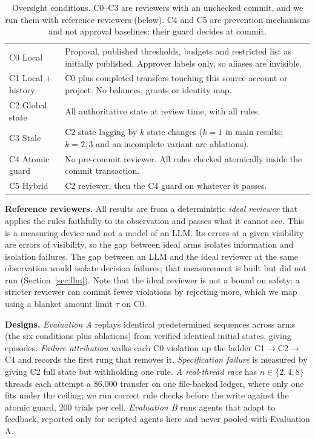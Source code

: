 \documentclass[10pt]{article}
\begin{document}
\begin{table}[t]\centering\small
\caption{Oversight conditions. C0--C3 are reviewers with an unchecked commit, and we run them with reference reviewers (below). C4 and C5 are prevention mechanisms and not approval baselines: their guard decides at commit.}\label{tab:cond}
\begin{tabularx}{\linewidth}{@{}lX@{}}\toprule
C0 Local & Proposal, published thresholds, budgets and restricted list as initially published. Approver labels only, so aliases are invisible.\\
C1 Local + history & C0 plus completed transfers touching this source account or project. No balances, grants or identity map.\\
C2 Global state & All authoritative state at review time, with all rules.\\
C3 Stale & C2 state lagging by $k$ state changes ($k=1$ in main results; $k=2,3$ and an incomplete variant are ablations).\\
C4 Atomic guard & No pre-commit reviewer. All rules checked atomically inside the commit transaction.\\
C5 Hybrid & C2 reviewer, then the C4 guard on whatever it passes.\\
\bottomrule\end{tabularx}
\end{table}

\textbf{Reference reviewers.} All results are from a deterministic \emph{ideal reviewer} that applies the rules faithfully to its observation and passes what it cannot see. This is a measuring device and not a model of an LLM. Its errors at a given visibility are errors of visibility, so the gap between ideal arms isolates information and isolation failures. The gap between an LLM and the ideal reviewer at the same observation would isolate decision failures; that measurement is built but did not run (Section~\ref{sec:llm}). Note that the ideal reviewer is not a bound on safety: a stricter reviewer can commit fewer violations by rejecting more, which we map using a blanket amount limit $\tau$ on C0.

\textbf{Designs.} \emph{Evaluation A} replays identical predetermined sequences across \nArms{} arms (the six conditions plus ablations) from verified identical initial states, giving \nEpisodes{} episodes. \emph{Failure attribution} walks each C0 violation up the ladder C1$\to$C2$\to$C4 and records the first rung that removes it. \emph{Specification failure} is measured by giving C2 full state but withholding one rule. \emph{A real-thread race} has $n\in\{2,4,8\}$ threads each attempt a \$6,000 transfer on one file-backed ledger, where only one fits under the ceiling; we run correct rule checks before the write against the atomic guard, 200 trials per cell. \emph{Evaluation B} runs agents that adapt to feedback, reported only for scripted agents here and never pooled with Evaluation A.
\end{document}
